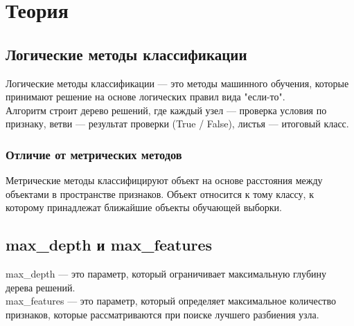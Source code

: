 \chapter{Теория}

\section{Логические методы классификации}
Логические методы классификации — это методы машинного обучения, которые принимают решение на основе логических правил вида "если-то". \\

Алгоритм строит дерево решений, где каждый узел — проверка условия по признаку,
ветви — результат проверки (True / False),
листья — итоговый класс.


\subsection{Отличие от метрических методов}
Метрические методы классифицируют объект на основе расстояния между объектами в пространстве признаков. Объект относится к тому классу, к которому принадлежат ближайшие объекты обучающей выборки.

\section{max\_depth и max\_features}

max\_depth — это параметр, который ограничивает максимальную глубину дерева решений. \\

max\_features — это параметр, который определяет максимальное количество признаков, которые рассматриваются при поиске лучшего разбиения узла.


\endinput